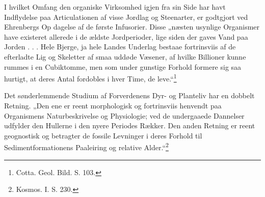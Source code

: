 \documentclass[12pt,a4paper]{book}
\renewcommand{\thefootnote}{*)}
\begin{document}
I hvilket Omfang den organiske Virksomhed igjen fra sin Side har havt
Indflydelse paa Articulationen af visse Jordlag og Steenarter, er godtgjort
ved Ehrenbergs Op\-%
dagelse af de første Infusorier. Disse „næsten usynlige Organismer have
existeret allerede i de ældste Jordperioder, lige siden der gaves Vand paa
Jorden . . . Hele Bjerge, ja hele Landes Underlag bestaae fortrinsviis af de
efterladte Lig og Skeletter af smaa uddøde Væsener, af hvilke Billioner kunne
rummes i en Cubiktomme, men som under gunstige Forhold formere sig saa
hurtigt, at deres Antal fordobles i hver Time, de leve.“\footnote{%
Cotta. Geol. Bild. S. 103.}

Det sønderlemmende Studium af Forverdenens Dyr- og Planteliv har en dobbelt
Retning. „Den ene er reent morphologisk og fortrinsviis henvendt paa
Organismens Naturbeskrivelse og Physiologie; ved de undergaaede Dannelser
udfylder den Hullerne i den nyere Periodes Rækker. Den anden Retning er reent
geognostisk og betragter de fossile Levninger i deres Forhold til
Sedimentformationens Paaleiring og relative
\renewcommand{\thefootnote}{**)}%
Alder.“\footnote{%
Kosmos. I. S. 230.}%
\renewcommand{\thefootnote}{*)}
\end{document}
